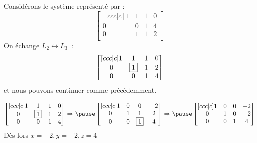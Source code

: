 \begin{frame}
Considérons le système représenté par :
\begin{equation*}
  \begin{bmatrix}[ccc|c]
    1 & 1 & 1 & 0\\
    0 & 0 & 1 & 4\\
    0 & 1 & 1 & 2\\
  \end{bmatrix}
\end{equation*}\pause{}
On échange \(L_{2} \leftrightarrow L_{3}\)~:
\begin{equation*}
  \begin{bmatrix}[ccc|c]
    1 & 1 & 1 & 0\\
    0 & \fbox{1} & 1 & 2\\
    0 & 0 & 1 & 4\\
  \end{bmatrix}
\end{equation*}
et nous pouvons continuer comme précédemment.
\end{frame}
\begin{frame}
  \begin{equation*}
    \begin{bmatrix}[ccc|c]
      1 & 1 & 1 & 0\\
      0 & \fbox{1} & 1 & 2\\
      0 & 0 & 1 & 4\\
    \end{bmatrix}
    \Rightarrow\pause
    \begin{bmatrix}[ccc|c]
      1 & 0 & 0 & -2\\
      0 & 1 & 1 & 2\\
      0 & 0 & \fbox{1} & 4\\
    \end{bmatrix}
    \Rightarrow\pause
    \begin{bmatrix}[ccc|c]
      1 & 0 & 0 & -2\\
      0 & 1 & 0 & -2\\
      0 & 0 & 1 & 4\\
    \end{bmatrix}
  \end{equation*}\pause{}
  Dès lors \(x = -2, y= -2, z = 4\)
\end{frame}

